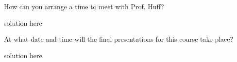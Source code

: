 \documentclass[12pts,answers]{exam}
\begin{document}
\begin{questions}
        \question[10] How can you arrange a time to meet with Prof. Huff?
        \begin{solution}
                solution here
        \end{solution}

        \question[10] At what date and time will the final presentations for this course take place?
        \begin{solution}
                solution here
        \end{solution}

\end{questions}



%
%
\end{document}

